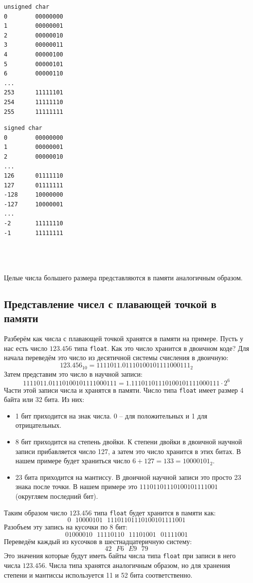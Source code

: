 \documentclass{article}
\begin{document}
\begin{minipage}{0.4\textwidth}
\begin{verbatim}
unsigned char
0        00000000
1        00000001
2        00000010
3        00000011
4        00000100
5        00000101
6        00000110
...
253      11111101
254      11111110
255      11111111
\end{verbatim}
\end{minipage}
\begin{minipage}{0.4\textwidth}
\begin{verbatim}
signed char
0        00000000
1        00000001
2        00000010
...
126      01111110
127      01111111
-128     10000000
-127     10000001
...
-2       11111110
-1       11111111
\end{verbatim}
\end{minipage}\\
\quad\\
\quad\\
Целые числа большего размера представляются в памяти аналогичным образом.
\subsection*{Представление чисел с плавающей точкой в памяти}
Разберём как числа с плавающей точкой хранятся в памяти на примере. Пусть у нас есть число $123.456$ типа \texttt{float}. Как это число хранится в двоичном коде? Для начала переведём это число из десятичной системы счисления в двоичную:
$$
123.456_{10} = 1111011.01110100101111000111_2
$$
Затем представим это число в научной записи:
$$
1111011.01110100101111000111 = 1.11101101110100101111000111 \cdot 2^6
$$
Части этой записи числа и хранятся в памяти.
Число типа \texttt{float} имеет размер 4 байта или 32 бита. Из них:
\begin{itemize}
\item 1 бит приходится на знак числа. 0 -- для положительных и 1 для отрицательных.
\item 8 бит приходится на степень двойки. К степени двойки в двоичной научной записи прибавляется число 127, а затем это число хранится в этих битах.
В нашем примере будет храниться число $6 + 127 = 133 = 10000101_2$.
\item 23 бита приходится на мантиссу. В двоичной научной записи это просто 23 знака после точки. В нашем примере это $11101101110100101111001$ (округляем последний бит).
\end{itemize}
Таким образом число $123.456$ типа \texttt{float} будет хранится в памяти как:
$$
0\ \ \ 10000101\ \ \ 11101101110100101111001
$$
Разобъем эту запись на кусочки по 8 бит:
$$
01000010\ \ \ 11110110\ \ \ 11101001\ \ \ 01111001
$$
Переведём каждый из кусочков в шестнадцатеричную систему:
$$
42\ \ \ F6\ \ \ E9\ \ \ 79
$$
Это значения которые будут иметь байты числа типа \texttt{float} при записи в него числа $123.456$.
Числа типа хранятся аналогичным образом, но для хранения степени и мантиссы используется 11 и 52 бита соответственно.
\end{document}
